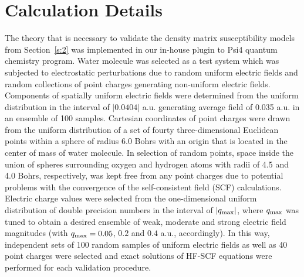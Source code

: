 \documentclass[aip,amsmath,amssymb,reprint,floatfix]{revtex4-1}
\begin{document}
\section{\label{s:3}Calculation Details}

The theory that is necessary to validate the density matrix susceptibility models from Section~\ref{s:2}
was implemented in our in\hyp{}house plugin to {\sc Psi4} quantum chemistry program.\cite{Psi4.JCTC.2017}
Water molecule
was selected as a test system which was subjected to 
electrostatic perturbations due to random uniform electric fields and random collections of point charges
generating non\hyp{}uniform electric fields. 
Components of spatially uniform electric fields were determined 
from the uniform distribution in the interval of $\vert 0.0404 \vert$ a.u.
generating average field of 0.035 a.u. in an ensemble of 100 samples.
Cartesian coordinates of point charges were drawn from the uniform distribution 
of a set of fourty three\hyp{}dimensional Euclidean points within a sphere of radius 6.0 Bohrs
with an origin that is located in the center of mass of water molecule.
In selection of random points, space inside the union of spheres surrounding
oxygen and hydrogen atoms with radii of 4.5 and 4.0 Bohrs, respectively, was
kept free from any point charges due to potential problems with the convergence of the 
self\hyp{}consistent field (SCF) calculations.
Electric charge values were selected from the one\hyp{}dimensional uniform distribution
of double precision numbers in the interval of $\vert q_{\rm max} \vert$, where $q_{\rm max}$
was tuned to obtain a desired ensemble of weak, moderate and strong electric field magnitudes
(with $q_{\rm max}=0.05$, $0.2$ and $0.4$ a.u., accordingly).
In this way, independent sets of 100 random samples of uniform electric fields as well as 
40 point charges were selected and exact solutions of HF\hyp{}SCF equations were 
performed for each validation procedure.
\end{document}
